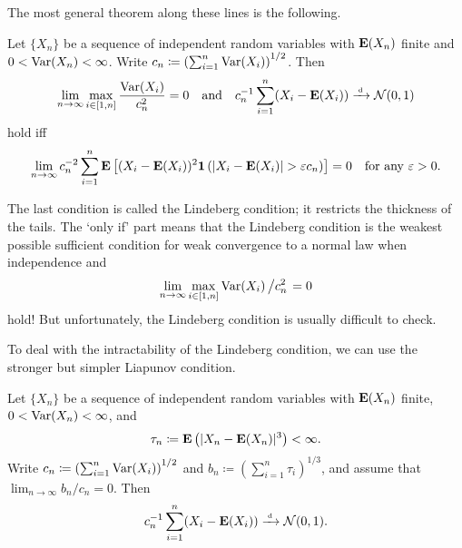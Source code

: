 \documentclass[11pt,letterpaper,reqno,oneside]{article}
\begin{document}
The most general theorem along these lines is the following.
%
\begin{theorem}
	Let $\{ X_n \}$ be a sequence of independent random variables with $\mathbf{E}(X_n)$ finite and $0 < \mathrm{Var}(X_n) < \infty$. Write $c_n \coloneqq \left( \sum_{i=1}^n \mathrm{Var}(X_i) \right)^{1/2}$. Then
	\begin{equation*}
		\lim_{n\to\infty} \max_{i \in [1,n]} 
		\frac{ \mathrm{Var}(X_i) }{ c_n^2 }
		= 0
		\quad\text{and}\quad
		c_n^{-1}
		\sum_{i=1}^n ( X_i - \mathbf{E}(X_i) )
		\xrightarrow{{\scriptscriptstyle \mathrm{\;d\;}}} \mathcal{N}(0,1) 
	\end{equation*}
	hold iff
	\begin{equation*}
		\lim_{n\to\infty} 
		c_n^{-2}
		\sum_{i=1}^n 
		\mathbf{E}\left[
		(X_i-\mathbf{E}(X_i))^2
		\boldsymbol{1}\left( \lvert X_i-\mathbf{E}(X_i)\rvert > \varepsilon c_n \right)
		\right]
		= 0 
		\quad\text{for any $\varepsilon>0$} .
	\end{equation*}
\end{theorem}


\begin{remark}
	The last condition is called the Lindeberg condition; it restricts the thickness of the tails. The `only if' part means that the Lindeberg condition is the weakest possible sufficient condition for weak convergence to a normal law when independence and
	\begin{equation*}
		\lim_{n\to\infty} \max_{i \in [1,n]} \mathrm{Var}(X_i) \left/ c_n^2 \right. = 0
	\end{equation*}
	hold! But unfortunately, the Lindeberg condition is usually difficult to check.
\end{remark}


To deal with the intractability of the Lindeberg condition, we can use the stronger but simpler Liapunov condition.
%
\begin{theorem}
	Let $\{ X_n \}$ be a sequence of independent random variables with $\mathbf{E}(X_n)$ finite, $0 < \mathrm{Var}(X_n) < \infty$, and
	\begin{equation*}
		\tau_n \coloneqq \mathbf{E}\left( \lvert X_n - \mathbf{E}(X_n) \rvert^3 \right) < \infty .
	\end{equation*}
	Write $c_n \coloneqq \left( \sum_{i=1}^n \mathrm{Var}(X_i) \right)^{1/2}$ and $b_n \coloneqq \left( \sum_{i=1}^n \tau_i \right)^{1/3}$, and assume that $\lim_{n\to\infty} b_n/c_n = 0$. Then
	\begin{equation*}
		c_n^{-1}
		\sum_{i=1}^n ( X_i - \mathbf{E}(X_i) )
		\xrightarrow{{\scriptscriptstyle \mathrm{\;d\;}}} \mathcal{N}(0,1) .
	\end{equation*}
\end{theorem}
\end{document}
